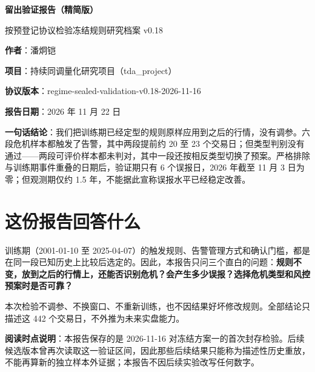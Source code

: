 \documentclass[12pt,a4paper]{ctexart}
\begin{document}
\begin{titlepage}
\vspace*{3.2cm}
\begin{center}
{\LARGE\bfseries 留出验证报告（精简版）\par}
\vspace{0.8cm}
{\large 按预登记协议检验冻结规则\quad 研究档案 v0.18\par}
\vspace{2.0cm}
{\normalsize \textbf{作者}：潘炯铠\par\vspace{0.35em}}
{\normalsize \textbf{项目}：持续同调量化研究项目（tda\_project）\par\vspace{0.35em}}
{\normalsize \textbf{协议版本}：regime-sealed-validation-v0.18-2026-11-16\par\vspace{0.35em}}
{\normalsize \textbf{报告日期}：2026 年 11 月 22 日\par}
\vspace{2.4cm}
\begin{minipage}{0.82\textwidth}
\small
\textbf{一句话结论}：我们把训练期已经定型的规则原样应用到之后的行情，没有调参。六段危机样本都触发了告警，其中两段提前约 20 至 23 个交易日；但类型判别没有通过——两段可评价样本都未判对，其中一段还按相反类型切换了预案。严格排除与训练期事件重叠的日期后，验证期只有 6 个误报日，2026 年截至 11 月 3 日为零；但观测期仅约 1.5 年，不能据此宣称误报水平已经稳定改善。
\end{minipage}
\end{center}
\end{titlepage}

\section{这份报告回答什么}

训练期（2001-01-10 至 2025-04-07）的触发规则、告警管理方式和确认门槛，都是在同一段已知历史上比较后选定的。因此，本报告只问三个直白的问题：\textbf{规则不变，放到之后的行情上，还能否识别危机？会产生多少误报？选择危机类型和风控预案时是否可靠？}

本次检验不调参、不换窗口、不重新训练，也不因结果好坏修改规则。全部结论只描述这 442 个交易日，不外推为未来实盘能力。

\textbf{阅读时点说明}：本报告保存的是 2026-11-16 对冻结方案一的首次封存检验。后续候选版本曾再次读取这一验证区间，因此那些后续结果只能称为描述性历史重放，不能再算新的独立样本外证据；本报告不因后续实验改写任何数字。
\end{document}
